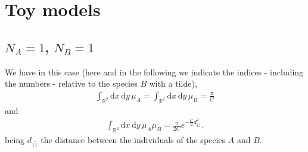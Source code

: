 \documentclass[12pt]{article}
\newcommand{\xd}{\mathrm{d}}
\numberwithin{equation}{section} %
\numberwithin{figure}{section} %
\theoremstyle{definition}
\begin{document}
\section{Toy models}
\subsection{$N_A=1$, $N_B=1$}
We have in this case (here and in the following we indicate the indices - including the numbers - relative to the species $B$ with a tilde),
\begin{align}
\int_{{\mathbb R}^2} \xd x \, \xd y \, \mu_A = \int_{{\mathbb R}^2} \xd x \, \xd y \, \mu_B =  \frac{\pi}{C}
\end{align}
and
\begin{align}
\int_{{\mathbb R}^2} \xd x \, \xd y \, \mu_A \mu_B =  \frac{\pi}{2C} e^{- \frac{C}{2}d^2_{1\tilde{1}}}.
\end{align}
being $d_{1\tilde{1}}$ the distance between the individuals of the species $A$ and $B$.
\end{document}
